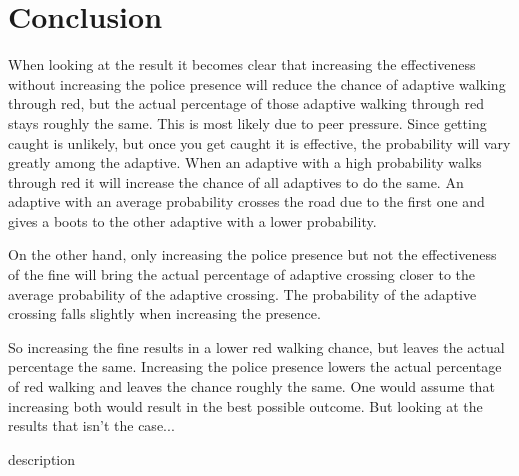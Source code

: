 \documentclass[a4paper]{article}
\begin{document}
\clearpage

\section{Conclusion}
When looking at the result it becomes clear that increasing the effectiveness without increasing the police presence will reduce the chance of adaptive walking through red, but the actual percentage of those adaptive walking through red stays roughly the same. This is most likely due to peer pressure. Since getting caught is unlikely, but once you get caught it is effective, the probability will vary greatly among the adaptive. When an adaptive with a high probability walks through red it will increase the chance of all adaptives to do the same. An adaptive with an average probability crosses the road due to the first one and gives a boots to the other adaptive with a lower probability.

On the other hand, only increasing the police presence but not the effectiveness of the fine will bring the actual percentage of adaptive crossing closer to the average probability of the adaptive crossing. The probability of the adaptive crossing falls slightly when increasing the presence.

So increasing the fine results in a lower red walking chance, but leaves the actual percentage the same. Increasing the police presence lowers the actual percentage of red walking and leaves the chance roughly the same. One would assume that increasing both would result in the best possible outcome. But looking at the results that isn't the case...

\clearpage

\begin{thebibliography}{3}

	 description

\end{thebibliography}
\end{document}
